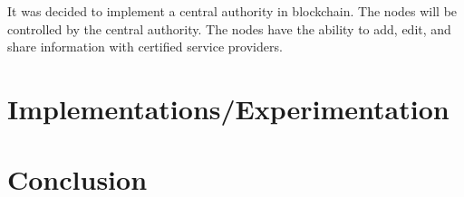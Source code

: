 \documentclass[letterpaper, 10 pt, conference]{ieeeconf}  %
\begin{document}
It was decided to implement a central authority in blockchain. The nodes will be controlled by the central authority. The nodes have the ability to add, edit, and share information with certified service providers. 

\section{Implementations/Experimentation}

\section{Conclusion}



\end{document}
